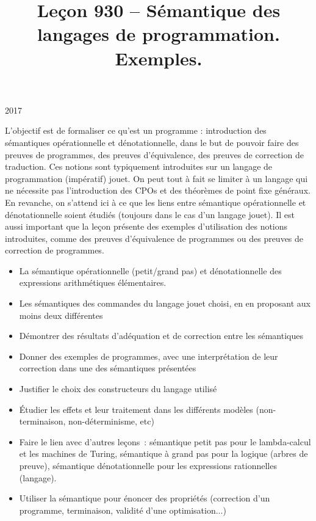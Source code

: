 \documentclass{article}
\title{Leçon 930 -- Sémantique des langages de programmation. Exemples.}
\begin{document}
\maketitle

\secrapports

\begin{rapport}{2017}

    L’objectif est de formaliser ce qu’est un programme : introduction des
    sémantiques opérationnelle et dénotationnelle, dans le but de pouvoir faire
    des preuves de programmes, des preuves d’équivalence, des preuves de
    correction de traduction. Ces notions sont typiquement introduites sur un
    langage de programmation (impératif) jouet. On peut tout à fait se limiter à
    un langage qui ne nécessite pas l’introduction des CPOs et des théorèmes de
    point fixe généraux. En revanche, on s’attend ici à ce que les liens entre
    sémantique opérationnelle et dénotationnelle soient étudiés (toujours dans le
    cas d’un langage jouet). Il est aussi important que la leçon présente des
    exemples d’utilisation des notions introduites, comme des preuves
    d’équivalence de programmes ou des preuves de correction de programmes.

\end{rapport}

\secindispensables

\begin{itemize}
    \item La sémantique opérationnelle (petit/grand pas) et dénotationnelle
        des expressions arithmétiques élémentaires.
    \item Les sémantiques des commandes du langage jouet choisi, en en proposant 
        aux moins deux différentes
    \item Démontrer des résultats d'adéquation et de correction entre les 
        sémantiques
    \item Donner des exemples de programmes, avec une interprétation de leur 
        correction dans une des sémantiques présentées
    \item Justifier le choix des constructeurs du langage utilisé
    \item Étudier les effets et leur traitement dans les différents modèles 
        (non-terminaison, non-déterminisme, etc)
    \item Faire le lien avec d'autres leçons~: 
        sémantique petit pas pour le lambda-calcul et les machines de Turing,
        sémantique à grand pas pour la logique (arbres de preuve),
        sémantique dénotationnelle pour les expressions rationnelles (langage).
    \item Utiliser la sémantique pour énoncer des propriétés (correction d'un
        programme, terminaison, validité d'une optimisation...)
\end{itemize}
\end{document}
